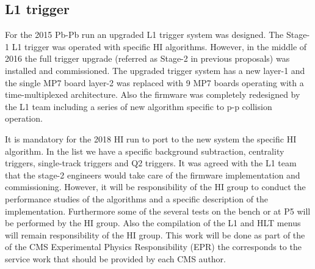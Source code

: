 \subsection{L1 trigger\label{subsec:L1Trigger}}
For the 2015 Pb-Pb run an upgraded L1 trigger system was designed. The Stage-1 L1 trigger was operated with specific HI algorithms. However, in the middle of 2016 the full trigger upgrade (referred as Stage-2 in previous proposals) was installed and commissioned. The upgraded trigger system has a new layer-1 and the single MP7 board layer-2 was replaced with 9 MP7 boards operating with a time-multiplexed architecture. Also the firmware was completely redesigned by the L1 team including a series of new algorithm specific to p-p collision operation. 

It is mandatory for the 2018 HI run to port to the new system the specific HI algorithm. In the list we have a specific background subtraction, centrality triggers, single-track triggers and Q2 triggers. It was agreed with the L1 team that the stage-2 engineers would take care of the firmware implementation and commissioning. However, it will be responsibility of the HI group to conduct the performance studies of the algorithms and a specific description of the implementation. Furthermore some of the several tests on the bench or at P5 will be performed by the HI group. Also the compilation of the L1 and HLT menus will remain responsibility of the HI group. This work will be done as part of the of the CMS Experimental Physics Responsibility (EPR) the corresponds to the service work that should be provided by each CMS author. 
